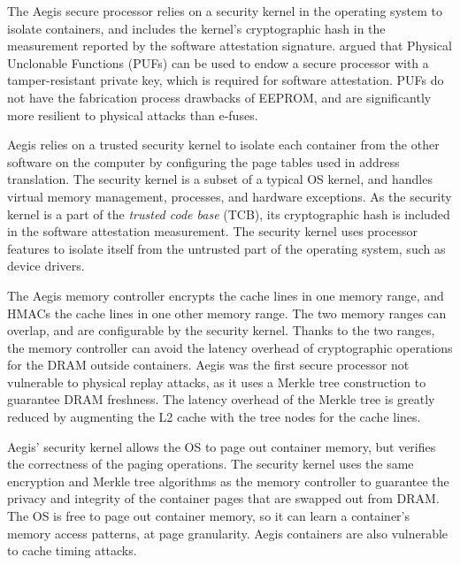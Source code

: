 \label{sec:sgx_related_aegis}

The Aegis secure processor \cite{suh2003aegis} relies on a security kernel in the operating system to isolate containers, and includes the kernel's cryptographic hash in the measurement reported by the software attestation signature.  \cite{aegis_impl} argued that
Physical Unclonable Functions (PUFs) \cite{gassend2002puf} can be used to
endow a secure processor with a tamper-resistant private key, which is required
for software attestation. PUFs do not have the fabrication process drawbacks of
EEPROM, and are significantly more resilient to physical attacks than e-fuses.

Aegis relies on a trusted security kernel to isolate each container from the
other software on the computer by configuring the page tables used in address
translation. The security kernel is a subset of a typical OS kernel, and
handles virtual memory management, processes, and hardware exceptions. As the
security kernel is a part of the \textit{trusted code base} (TCB), its
cryptographic hash is included in the software attestation measurement. The
security kernel uses processor features to isolate itself from the untrusted
part of the operating system, such as device drivers.

The Aegis memory controller encrypts the cache lines in one memory range, and
HMACs the cache lines in one other memory range. The two memory ranges can
overlap, and are configurable by the security kernel. Thanks to the two ranges,
the memory controller can avoid the latency overhead of cryptographic
operations for the DRAM outside containers. Aegis was the first secure processor not vulnerable to physical
replay attacks, as it uses a Merkle tree construction \cite{gassend2003merkle}
to guarantee DRAM freshness. The latency overhead of the Merkle tree is greatly
reduced by augmenting the L2 cache with the tree nodes for the cache lines.

Aegis' security kernel allows the OS to page out container memory, but verifies
the correctness of the paging operations. The security kernel uses the same
encryption and Merkle tree algorithms as the memory controller to guarantee the
privacy and integrity of the container pages that are swapped out from DRAM.
The OS is free to page out container memory, so it can learn a container's
memory access patterns, at page granularity. Aegis containers are also
vulnerable to cache timing attacks.
